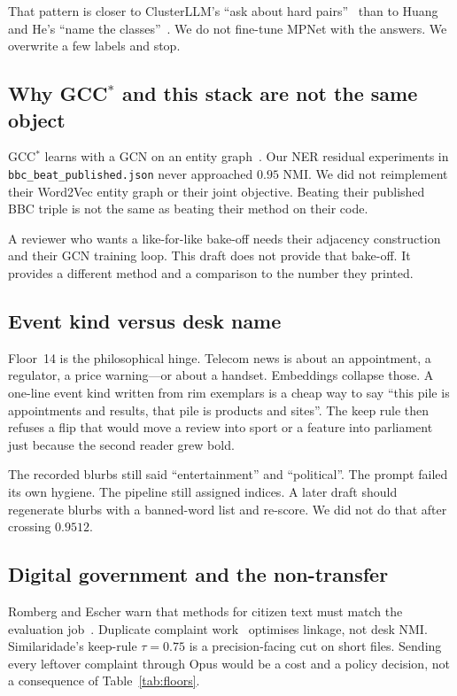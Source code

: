 \documentclass[11pt,a4paper]{article}
\begin{document}
That pattern is closer to ClusterLLM's ``ask about hard
pairs''~\cite{zhang2023clusterllm} than to Huang and He's
``name the classes''~\cite{huang2024tcllc}. We do not
fine-tune MPNet with the answers. We overwrite a few
labels and stop.

\subsection{Why GCC$^*$ and this stack are not the same object}

GCC$^*$ learns with a GCN on an entity graph~\cite{keraghel2024gcc}.
Our NER residual experiments in
\texttt{bbc\_beat\_published.json} never approached $0.95$
NMI. We did not reimplement their Word2Vec entity graph or
their joint objective. Beating their published BBC triple
is not the same as beating their method on their code.

A reviewer who wants a like-for-like bake-off needs their
adjacency construction and their GCN training loop. This
draft does not provide that bake-off. It provides a
different method and a comparison to the number they
printed.

\subsection{Event kind versus desk name}

Floor~14 is the philosophical hinge. Telecom news is about
an appointment, a regulator, a price warning---or about a
handset. Embeddings collapse those. A one-line event kind
written from rim exemplars is a cheap way to say ``this pile
is appointments and results, that pile is products and
sites''. The keep rule then refuses a flip that would move
a review into sport or a feature into parliament just
because the second reader grew bold.

The recorded blurbs still said ``entertainment'' and
``political''. The prompt failed its own hygiene. The
pipeline still assigned indices. A later draft should
regenerate blurbs with a banned-word list and re-score. We
did not do that after crossing $0.9512$.

\subsection{Digital government and the non-transfer}

Romberg and Escher warn that methods for citizen text must
match the evaluation job~\cite{romberg2023citizens}. Duplicate
complaint work~\cite{rabbi2026duplicate,das2020grievance}
optimises linkage, not desk NMI. Similaridade's keep-rule
$\tau=0.75$ is a precision-facing cut on short files. Sending
every leftover complaint through Opus would be a cost and a
policy decision, not a consequence of Table~\ref{tab:floors}.
\end{document}
